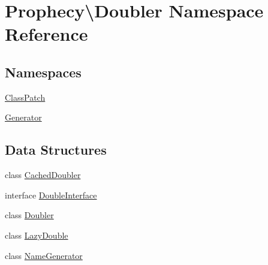 \hypertarget{namespace_prophecy_1_1_doubler}{}\section{Prophecy\textbackslash{}Doubler Namespace Reference}
\label{namespace_prophecy_1_1_doubler}
\subsection*{Namespaces}
\begin{DoxyCompactItemize}
\item 
 \mbox{\hyperlink{namespace_prophecy_1_1_doubler_1_1_class_patch}{Class\+Patch}}
\item 
 \mbox{\hyperlink{namespace_prophecy_1_1_doubler_1_1_generator}{Generator}}
\end{DoxyCompactItemize}
\subsection*{Data Structures}
\begin{DoxyCompactItemize}
\item 
class \mbox{\hyperlink{class_prophecy_1_1_doubler_1_1_cached_doubler}{Cached\+Doubler}}
\item 
interface \mbox{\hyperlink{interface_prophecy_1_1_doubler_1_1_double_interface}{Double\+Interface}}
\item 
class \mbox{\hyperlink{class_prophecy_1_1_doubler_1_1_doubler}{Doubler}}
\item 
class \mbox{\hyperlink{class_prophecy_1_1_doubler_1_1_lazy_double}{Lazy\+Double}}
\item 
class \mbox{\hyperlink{class_prophecy_1_1_doubler_1_1_name_generator}{Name\+Generator}}
\end{DoxyCompactItemize}
